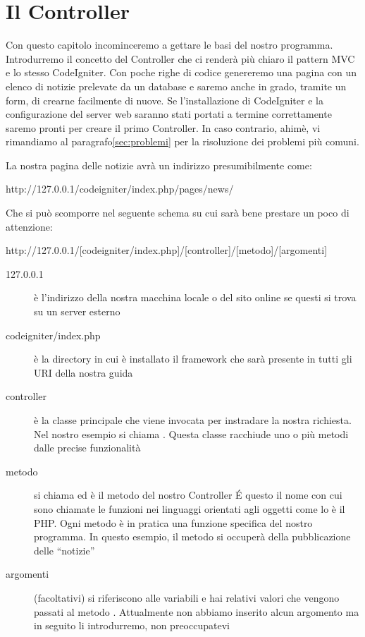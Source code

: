 \section{Il Controller}
\label{cap:controller}

Con questo capitolo incominceremo a gettare le basi del nostro programma. Introdurremo il concetto del Controller che ci renderà più chiaro il pattern \ac{MVC} e lo stesso CodeIgniter. Con poche righe di codice genereremo una pagina con un elenco di notizie prelevate da un database e saremo anche in grado, tramite un form, di crearne facilmente di nuove. Se l'installazione di CodeIgniter e la configurazione del server web saranno stati portati a termine correttamente saremo pronti per creare il primo Controller. In caso contrario, ahimè, vi rimandiamo al paragrafo\vref{sec:problemi} per la risoluzione dei problemi più comuni.

La nostra pagina delle notizie avrà un indirizzo presumibilmente come:

\begin{code}
http://127.0.0.1/codeigniter/index.php/pages/news/
\end{code}

Che si può scomporre nel seguente schema su cui sarà bene prestare un poco di attenzione:

\label{sec:urisintassi}
\begin{code}
http://127.0.0.1/[codeigniter/index.php]/[controller]/[metodo]/[argomenti]
\end{code}


\begin{description}
\item [127.0.0.1] è l'indirizzo della nostra macchina locale o del sito online se questi si trova su un server esterno
\item [codeigniter/index.php] è la directory in cui è installato il framework che sarà presente in tutti gli \ac{URI} della nostra guida
\item [controller] è la classe principale che viene invocata per instradare la nostra richiesta. Nel nostro esempio si chiama . Questa classe racchiude uno o più metodi dalle precise funzionalità
\item [metodo] si chiama  ed è il metodo del nostro Controller  \'E questo il nome con cui sono chiamate le funzioni nei linguaggi orientati agli oggetti come lo è il \ac{PHP}. Ogni metodo è in pratica una funzione specifica del nostro programma. In questo esempio, il metodo  si occuperà della pubblicazione delle ``notizie''
\item [argomenti] (facoltativi) si riferiscono alle variabili e hai relativi valori che vengono passati al metodo . Attualmente non abbiamo inserito alcun argomento ma in seguito li introdurremo, non preoccupatevi
\end{description}

